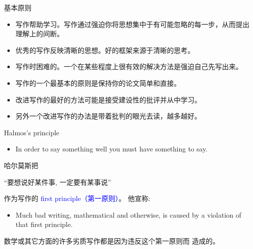 \documentclass[12pt]{ctexbeamer}
\newcommand{\blue}[1]{\textcolor{blue}{#1}}
\begin{document}
\begin{frame}{基本原则}

\begin{itemize}
	\item  写作帮助学习。写作通过强迫你将思想集中于有可能忽略的每一步，从而提出理解上的间断。
	\item 优秀的写作反映清晰的思想。好的框架来源于清晰的思考。
	\item  写作时困难的。一个在某些程度上很有效的解决方法是强迫自己先写出来。
	\item 写作的一个最基本的原则是保持你的论文简单和直接。
	\item 改进写作的最好的方法可能是接受建设性的批评并从中学习。
	\item 另外一个改进写作的办法是带着批判的眼光去读，越多越好。
\end{itemize}
\end{frame}

\begin{frame}{Halmos's principle}
\begin{itemize}
	\item  In order to say something well you must have something to say.
\end{itemize}

\pause
哈尔莫斯把
\begin{center}
“{要想说好某件事, 一定要有某事说}”
\end{center}

作为写作的 \blue{first principle（第一原则）}。
他宣称:

\begin{itemize}
    \item  Much bad writing, mathematical and otherwise, is caused by a violation of that first principle.
\end{itemize}

\pause

数学或其它方面的许多劣质写作都是因为违反这个第一原则而 造成的。



\end{frame}
\end{document}
